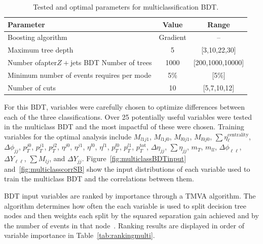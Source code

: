 \begin{table}[h!]
\centering
\begin{tabular}{|l|c|c|}
\hline
Parameter                                    & Value    & Range     \\
\hline
Boosting algorithm                           & Gradient & --        \\
Maximum tree depth                           &  5       & [3,10,22,30]    \\
Number ofapter{$Z+$jets BDT}
Number of trees                              &  1000    & [200,1000,10000] \\
Minimum number of events requires per mode   &  5\%     & [5\%]\\
Number of cuts                               &  10       & [5,7,10,12]  \\
\hline
\end{tabular}
\caption{Tested and optimal parameters for multiclassification BDT.}
\label{tab:multiBDTparameters}
\end{table}

For this BDT, variables were carefully chosen to optimize differences between each of the three classifications. Over 25 potentially useful variables were tested in the multiclass BDT and the most impactful of these were chosen. Training variables for the optimal analysis include $M_{l1j1}$, $M_{l1j0}$, $M_{l0j1}$, $M_{l0j0}$, $\sum \eta_\ell^{\mathrm{centrality}}$, $\Delta \phi_{jj}$, $p_T^{j0}$, $p_T^{j1}$, $p_T^{j2}$, $\eta^{j0}$, $\eta^{j1}$, $\eta^{l0}$, $\eta^{l1}$, $p_T^{l0}$, $p_T^{l1}$, $p_T^{\text{tot}}$, $\Delta \eta_{jj}$, $\sum \eta_{jj}$, $m_T$, $m_{ll}$, $\Delta \phi_{\ell\ell}$, $\Delta Y_{\ell\ell}$, $\sum M_{lj}$, and $\Delta Y_{jj}$. Figure~\ref{fig:multiclassBDTinput} and~\ref{fig:multiclasscorrSB} show the input distributions of each variable used to train the multiclass BDT and the correlations between them.

BDT input variables are ranked by importance through a TMVA algorithm. The algorithm determines how often the each variable is used to split decision tree nodes and then weights each split by the squared separation gain achieved and by the number of events in that node~\cite{TMVA}. Ranking results are displayed in order of variable importance in Table~\ref{tab:rankingmulti}.

